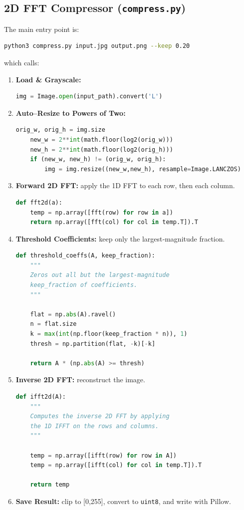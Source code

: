 \documentclass[12pt]{article}
\begin{document}
\subsection{2D FFT Compressor (\texttt{compress.py})}
The main entry point is:
\begin{lstlisting}[language=bash]
python3 compress.py input.jpg output.png --keep 0.20
\end{lstlisting}
which calls:
\begin{enumerate}
  \item \textbf{Load \& Grayscale:}
    \begin{lstlisting}[language=Python]
    img = Image.open(input_path).convert('L')
    \end{lstlisting}
  \item \textbf{Auto–Resize to Powers of Two:}
    \begin{lstlisting}[language=Python]
    orig_w, orig_h = img.size
    new_w = 2**int(math.floor(log2(orig_w)))
    new_h = 2**int(math.floor(log2(orig_h)))
    if (new_w, new_h) != (orig_w, orig_h):
        img = img.resize((new_w,new_h), resample=Image.LANCZOS)
    \end{lstlisting}
  \item \textbf{Forward 2D FFT:} apply the 1D FFT to each row, then each column.
    \begin{lstlisting}[language=Python]
def fft2d(a):
    temp = np.array([fft(row) for row in a])
    return np.array([fft(col) for col in temp.T]).T
    \end{lstlisting}
  \item \textbf{Threshold Coefficients:} keep only the largest‐magnitude fraction.
   \begin{lstlisting}[language=Python]
   def threshold_coeffs(A, keep_fraction):
    """
    Zeros out all but the largest-magnitude
    keep_fraction of coefficients.
    """

    flat = np.abs(A).ravel()
    n = flat.size
    k = max(int(np.floor(keep_fraction * n)), 1)
    thresh = np.partition(flat, -k)[-k]

    return A * (np.abs(A) >= thresh)
    \end{lstlisting}
  \item \textbf{Inverse 2D FFT:} reconstruct the image.
    \begin{lstlisting}[language=Python]
def ifft2d(A):
    """
    Computes the inverse 2D FFT by applying
    the 1D IFFT on the rows and columns.
    """

    temp = np.array([ifft(row) for row in A])
    temp = np.array([ifft(col) for col in temp.T]).T

    return temp
    \end{lstlisting}
  \item \textbf{Save Result:} clip to [0,255], convert to \texttt{uint8}, and write with Pillow.
\end{enumerate}
\end{document}
